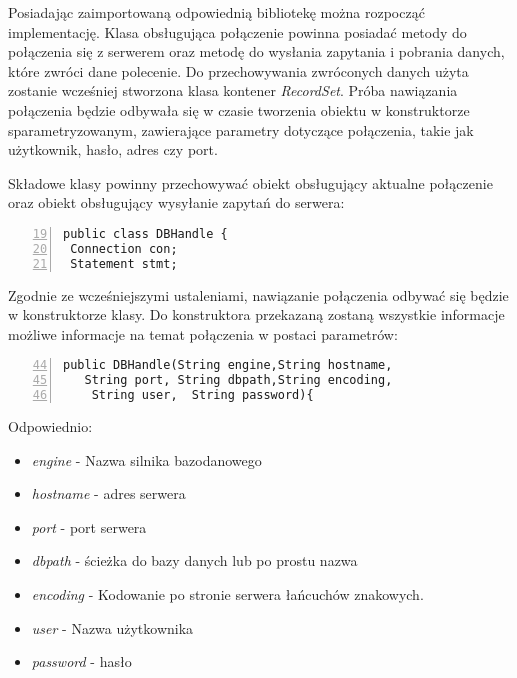 Posiadając zaimportowaną odpowiednią bibliotekę można rozpocząć implementację. Klasa obsługująca połączenie powinna posiadać metody do połączenia się z serwerem oraz metodę do wysłania zapytania i pobrania danych, które zwróci dane polecenie. Do przechowywania zwróconych danych użyta zostanie wcześniej stworzona klasa kontener \emph{RecordSet}. Próba nawiązania połączenia będzie odbywała się w czasie tworzenia obiektu w konstruktorze sparametryzowanym, zawierające parametry dotyczące połączenia, takie jak użytkownik, hasło, adres czy port.
\par
Składowe klasy powinny przechowywać obiekt obsługujący aktualne połączenie oraz obiekt obsługujący wysyłanie zapytań do serwera:
 \begin{lstlisting}[numbers=left,firstnumber=19]
public class DBHandle {
 Connection con;
 Statement stmt; 
  \end{lstlisting}
  Zgodnie ze wcześniejszymi ustaleniami, nawiązanie połączenia odbywać się będzie w konstruktorze klasy. Do konstruktora przekazaną zostaną wszystkie informacje możliwe informacje na temat połączenia w postaci parametrów:
   \begin{lstlisting}[numbers=left,firstnumber=44]
   public DBHandle(String engine,String hostname,
   String port, String dbpath,String encoding,
    String user,  String password){
   \end{lstlisting}
Odpowiednio:
    \begin{itemize}
    \item \emph{engine} - Nazwa silnika bazodanowego
    \item \emph{hostname} - adres serwera
    \item \emph{port} - port serwera
    \item \emph{dbpath} - ścieżka do bazy danych lub po prostu nazwa
    \item \emph{encoding} - Kodowanie po stronie serwera łańcuchów znakowych.
    \item \emph{user} - Nazwa użytkownika
    \item \emph{password} - hasło
    \end{itemize}

